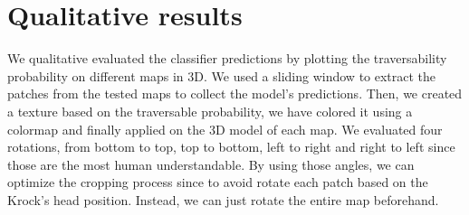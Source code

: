 \documentclass[../document.tex]{subfiles}
\begin{document}
\section{Qualitative results}
We qualitative evaluated the classifier predictions by plotting the traversability probability on different maps in 3D.  We used a sliding window to extract the patches from the tested maps to collect the model's predictions. Then, we created a texture based on the traversable probability, we have colored it using a colormap and finally applied on the 3D model of each map. We evaluated four rotations, from bottom to top, top to bottom, left to right and right to left since those are the most human understandable. By using those angles, we can optimize the cropping process since to avoid rotate each patch based on the Krock's head position. Instead, we can just rotate the entire map beforehand. 
\end{document}
